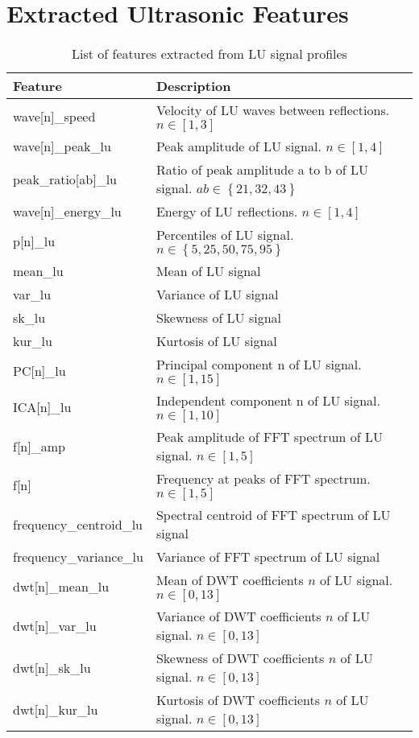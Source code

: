 \appendix
\chapter{Extracted Ultrasonic Features}
\label{app: feature}

\begin{table}[!h]
    \centering
    \caption{List of features extracted from LU signal profiles}
    \label{table: lu feature}
    \begin{tabularx}{\textwidth}{
      >{\arraybackslash\hsize=0.45\hsize}X
      >{\arraybackslash}X
    }
      \toprule
      Feature & Description \\
      \midrule
      wave[n]\_speed & Velocity of LU waves between reflections. $n \in \left[ 1, 3 \right] $  \\
      wave[n]\_peak\_lu & Peak amplitude of LU signal. $n \in \left[ 1, 4 \right] $ \\
      peak\_ratio[ab]\_lu & Ratio of peak amplitude a to b of LU signal. $ab \in \left\{ 21, 32, 43 \right\} $ \\
      wave[n]\_energy\_lu & Energy of LU reflections. $n \in \left[ 1, 4 \right] $ \\
      p[n]\_lu & Percentiles of LU signal. $n \in \left\{5, 25, 50, 75, 95 \right\}$ \\
      mean\_lu & Mean of LU signal \\
      var\_lu & Variance of LU signal \\
      sk\_lu & Skewness of LU signal \\
      kur\_lu & Kurtosis of LU signal \\
      PC[n]\_lu & Principal component n of LU signal. $n \in \left[ 1, 15 \right]$ \\
      ICA[n]\_lu & Independent component n of LU signal. $n \in \left[ 1, 10 \right]$ \\
      f[n]\_amp & Peak amplitude of FFT spectrum of LU signal. $n \in \left[ 1, 5 \right] $ \\
      f[n] & Frequency at peaks of FFT spectrum. $n \in \left[ 1, 5 \right] $ \\
      frequency\_centroid\_lu & Spectral centroid of FFT spectrum of LU signal \\
      frequency\_variance\_lu & Variance of FFT spectrum of LU signal \\
      dwt[n]\_mean\_lu & Mean of DWT coefficients $n$ of LU signal. $n \in \left[ 0, 13 \right] $ \\
      dwt[n]\_var\_lu & Variance of DWT coefficients $n$ of LU signal. $n \in \left[ 0, 13 \right] $ \\
      dwt[n]\_sk\_lu & Skewness of DWT coefficients $n$ of LU signal. $n \in \left[ 0, 13 \right] $ \\
      dwt[n]\_kur\_lu & Kurtosis of DWT coefficients $n$ of LU signal. $n \in \left[ 0, 13 \right] $ \\
      \bottomrule
    \end{tabularx}
\end{table}

